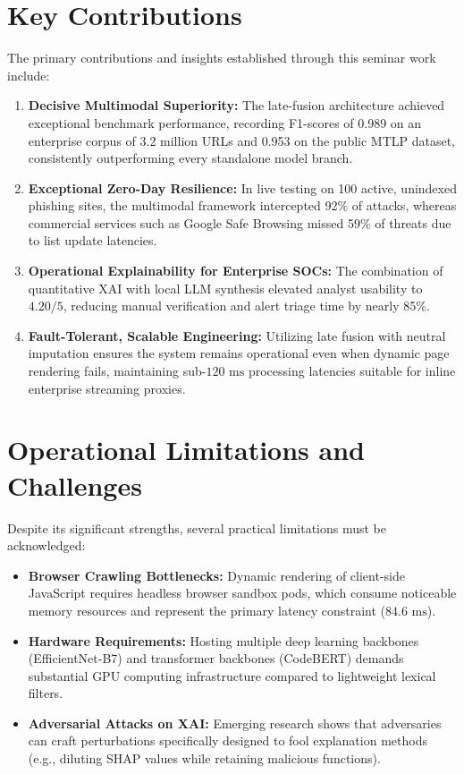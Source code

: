 \section{Key Contributions}
The primary contributions and insights established through this seminar work include:
\begin{enumerate}
\item \textbf{Decisive Multimodal Superiority:} The late-fusion architecture achieved exceptional benchmark performance, recording F1-scores of 0.989 on an enterprise corpus of 3.2 million URLs and 0.953 on the public MTLP dataset, consistently outperforming every standalone model branch.
\item \textbf{Exceptional Zero-Day Resilience:} In live testing on 100 active, unindexed phishing sites, the multimodal framework intercepted 92\% of attacks, whereas commercial services such as Google Safe Browsing missed 59\% of threats due to list update latencies.
\item \textbf{Operational Explainability for Enterprise SOCs:} The combination of quantitative XAI with local LLM synthesis elevated analyst usability to $4.20/5$, reducing manual verification and alert triage time by nearly 85\%.
\item \textbf{Fault-Tolerant, Scalable Engineering:} Utilizing late fusion with neutral imputation ensures the system remains operational even when dynamic page rendering fails, maintaining sub-$120\text{ ms}$ processing latencies suitable for inline enterprise streaming proxies.
\end{enumerate}

\section{Operational Limitations and Challenges}
Despite its significant strengths, several practical limitations must be acknowledged:
\begin{itemize}
\item \textbf{Browser Crawling Bottlenecks:} Dynamic rendering of client-side JavaScript requires headless browser sandbox pods, which consume noticeable memory resources and represent the primary latency constraint ($84.6\text{ ms}$).
\item \textbf{Hardware Requirements:} Hosting multiple deep learning backbones (EfficientNet-B7) and transformer backbones (CodeBERT) demands substantial GPU computing infrastructure compared to lightweight lexical filters.
\item \textbf{Adversarial Attacks on XAI:} Emerging research shows that adversaries can craft perturbations specifically designed to fool explanation methods (e.g., diluting SHAP values while retaining malicious functions).
\end{itemize}

